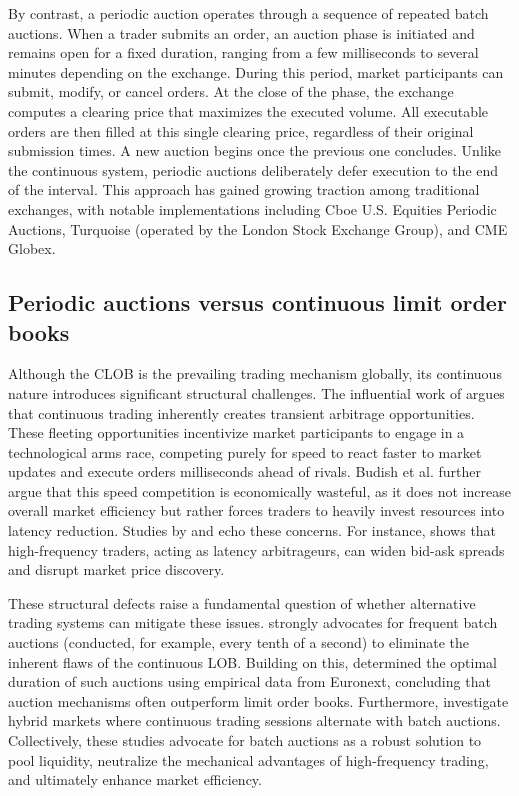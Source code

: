 \documentclass[12pt]{article}
\begin{document}
By contrast, a periodic auction operates through a sequence of repeated batch auctions. When a trader submits an order, an auction phase is initiated and remains open for a fixed duration, ranging from a few milliseconds to several minutes depending on the exchange. During this period, market participants can submit, modify, or cancel orders. At the close of the phase, the exchange computes a clearing price that maximizes the executed volume. All executable orders are then filled at this single clearing price, regardless of their original submission times. A new auction begins once the previous one concludes. Unlike the continuous system, periodic auctions deliberately defer execution to the end of the interval. This approach has gained growing traction among traditional exchanges, with notable implementations including Cboe U.S. Equities Periodic Auctions, Turquoise (operated by the London Stock Exchange Group), and CME Globex.

\subsection{Periodic auctions versus continuous limit order books}

Although the CLOB is the prevailing trading mechanism globally, its continuous nature introduces significant structural challenges. The influential work of \cite{budish2015high} argues that continuous trading inherently creates transient arbitrage opportunities. These fleeting opportunities incentivize market participants to engage in a technological arms race, competing purely for speed to react faster to market updates and execute orders milliseconds ahead of rivals. Budish et al. further argue that this speed competition is economically wasteful, as it does not increase overall market efficiency but rather forces traders to heavily invest resources into latency reduction. Studies by \cite{wah2013latency} and \cite{fs2012} echo these concerns. For instance, \cite{wah2013latency} shows that high-frequency traders, acting as latency arbitrageurs, can widen bid-ask spreads and disrupt market price discovery.

These structural defects raise a fundamental question of whether alternative trading systems can mitigate these issues. \cite{budish2015high} strongly advocates for frequent batch auctions (conducted, for example, every tenth of a second) to eliminate the inherent flaws of the continuous LOB. Building on this, \cite{paul2021optimal} determined the optimal duration of such auctions using empirical data from Euronext, concluding that auction mechanisms often outperform limit order books. Furthermore, \cite{duffie2017size,derchu2024ahead} investigate hybrid markets where continuous trading sessions alternate with batch auctions. Collectively, these studies advocate for batch auctions as a robust solution to pool liquidity, neutralize the mechanical advantages of high-frequency trading, and ultimately enhance market efficiency.
\end{document}

